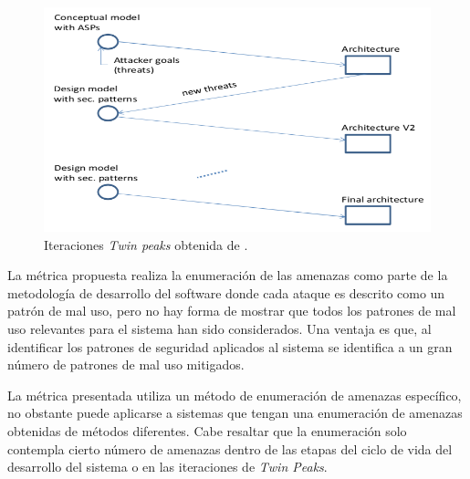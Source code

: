 \begin{figure}[!h]
  \centering
    \includegraphics[scale=0.5]{Imagenes/fig_iteTwinPeaks.png}
    \caption{Iteraciones \textit{Twin peaks} obtenida de \cite{FerYosWas18}.}
    \label{fig:twinpeaks}
\end{figure}

La métrica propuesta realiza la enumeración de las amenazas como parte de la metodología de desarrollo del software donde cada ataque es descrito como un patrón de mal uso, pero no hay forma de mostrar que todos los patrones de mal uso relevantes para el sistema han sido considerados. Una ventaja es que, al identificar los patrones de seguridad aplicados al sistema se identifica a un gran número de patrones de mal uso mitigados. 

\vspace{0.3 cm}

La métrica presentada utiliza un método de enumeración de amenazas específico, no obstante puede aplicarse a sistemas que tengan una enumeración de amenazas obtenidas de métodos diferentes. Cabe resaltar que la enumeración solo contempla cierto número de amenazas dentro de las etapas del ciclo de vida del desarrollo del sistema o en las iteraciones de \textit{Twin Peaks}.

